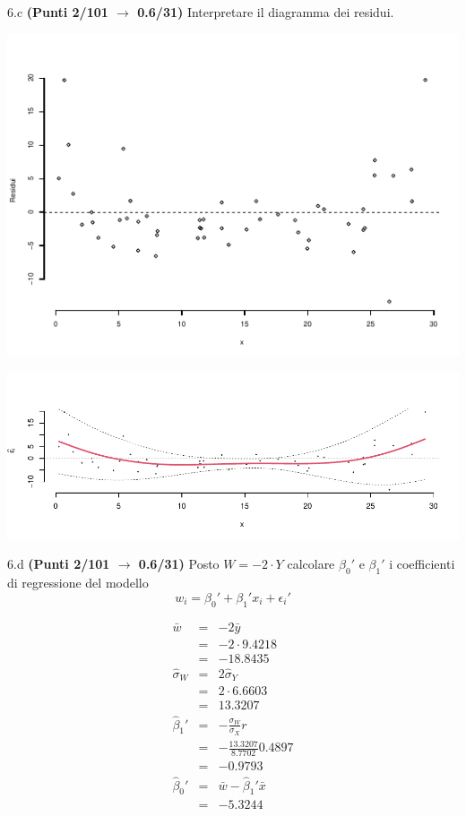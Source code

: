 \documentclass[
  11pt,
]{book}
\theoremstyle{mytheoremstyle}
\theoremstyle{mydefstyle}
\newenvironment{sol}
  {
  \begin{tcolorbox}[enhanced,breakable,arc=0.1mm,boxrule=1pt,colback=white,colframe=iblue,
  title=\bf \fontfamily{lmss}\selectfont \hspace{.5 cm} Soluzione,drop fuzzy shadow]

}{
\end{tcolorbox}
  }
\begin{document}
6.c \textbf{(Punti 2/101 \(\rightarrow\) 0.6/31)} Interpretare il diagramma dei residui.

\begin{center}\includegraphics{Esami_passati_con_soluzioni_files/figure-latex/2023-47,-1} \end{center}

\begin{sol}

\begin{center}\includegraphics{Esami_passati_con_soluzioni_files/figure-latex/2023-48,-1} \end{center}

\end{sol}

6.d \textbf{(Punti 2/101 \(\rightarrow\) 0.6/31)} Posto \(W=-2\cdot Y\) calcolare \(\beta_0'\) e \(\beta_1'\) i coefficienti di regressione del modello
\[
w_i = \beta_0'+\beta_1'x_i+\epsilon_i'
\]

\begin{sol}
\begin{eqnarray*}
  \bar w &=&  -2\bar y\\
  &=& -2\cdot9.4218\\
  &=& -18.8435\\
  \hat\sigma_W&=&2\hat\sigma_Y\\
  &=& 2\cdot6.6603\\
  &=& 13.3207\\
  \hat\beta_1' &=& -\frac{\sigma_W}{\sigma_X}r\\
  &=& -\frac{13.3207}{8.7702}0.4897\\
  &=& -0.9793\\
  \hat\beta_0'&=& \bar w - \hat\beta_1'\bar x\\
  &=& -5.3244
\end{eqnarray*}

\end{sol}
\end{document}
